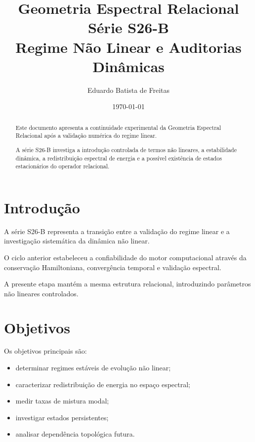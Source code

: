 \documentclass[11pt,a4paper]{article}
\title{
Geometria Espectral Relacional\\
Série S26-B\\
Regime Não Linear e Auditorias Dinâmicas
}
\author{
Eduardo Batista de Freitas 
}
\date{\today}
\begin{document}
\maketitle


\begin{abstract}

Este documento apresenta a continuidade experimental da
Geometria Espectral Relacional após a validação numérica
do regime linear.

A série S26-B investiga a introdução controlada de termos
não lineares, a estabilidade dinâmica, a redistribuição
espectral de energia e a possível existência de estados
estacionários do operador relacional.

\end{abstract}



\tableofcontents


\section{Introdução}

A série S26-B representa a transição entre a validação
do regime linear e a investigação sistemática da dinâmica
não linear.

O ciclo anterior estabeleceu a confiabilidade do motor
computacional através da conservação Hamiltoniana,
convergência temporal e validação espectral.

A presente etapa mantém a mesma estrutura relacional,
introduzindo parâmetros não lineares controlados.


\section{Objetivos}

Os objetivos principais são:

\begin{itemize}

\item determinar regimes estáveis de evolução não linear;

\item caracterizar redistribuição de energia no espaço espectral;

\item medir taxas de mistura modal;

\item investigar estados persistentes;

\item analisar dependência topológica futura.

\end{itemize}
\end{document}
